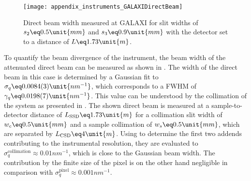 \documentclass[\main/dresen_thesis.tex]{subfiles}
\begin{document}
    \begin{figure}[ht]
      \centering
      \texttt{[image: appendix\_instruments\_GALAXIDirectBeam]}
      \caption{\label{fig:lss:galaxi:directBeam}Direct beam width measured at GALAXI for slit widths of $s_2 \eq 0.5 \unit{mm}$ and $s_3 \eq 0.9 \unit{mm}$ with the detector set to a distance of $L \eq 1.73 \unit{m}$.}
    \end{figure}
    To quantify the beam divergence of the instrument, the beam width of the attenuated direct beam can be measured as shown in .
    The width of the direct beam in this case is determined by a Gaussian fit to $\sigma_q \eq 0.0084(3) \unit{nm^{-1}}$, which corresponds to a FWHM of $\gamma_q \eq 0.0198(7) \unit{nm^{-1}}$.
    This value can be understood by the collimation of the system as presented in .
    The shown direct beam is measured at a sample-to-detector distance of $L_\mathrm{SSD} \eq 1.73 \unit{m}$ for a collimation slit width of $w_c \eq 0.5 \unit{mm}$ and a sample collimation of $w_s \eq 0.5 \unit{mm}$, which are separated by $L_\mathrm{CSD} \eq 4 \unit{m}$.
    Using  to determine the first two addends contributing to the instrumental resolution, they are evaluated to $\sigma_q^\mathrm{collimation} \approx 0.01 \unit{nm^{-1}}$, which is close to the Gaussian beam width.
    The contribution by the finite size of the pixel is on the other hand negligible in comparison with $\sigma_q^\mathrm{pixel} \approx 0.001 \unit{nm^{-1}}$.
\end{document}
